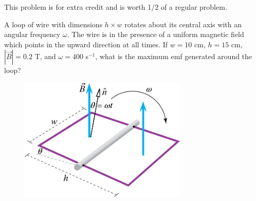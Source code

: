 \question This problem is for extra credit and is worth 1/2 of a regular problem.

A loop of wire with dimensions $h\times w$ rotates about its central axis with an angular frequency $\omega$. The wire is in the presence of a uniform magnetic field which points in the upward direction at all times. If $w=10$ cm, $h=15$ cm, $|\vec{B}|=0.2$ T, and $\omega=400$ s$^{-1}$, what is the maximum emf generated around the loop?

\begin{figure}[ht!]
	\centering
	\includegraphics[width=8cm]{examfig.jpg}
\end{figure}